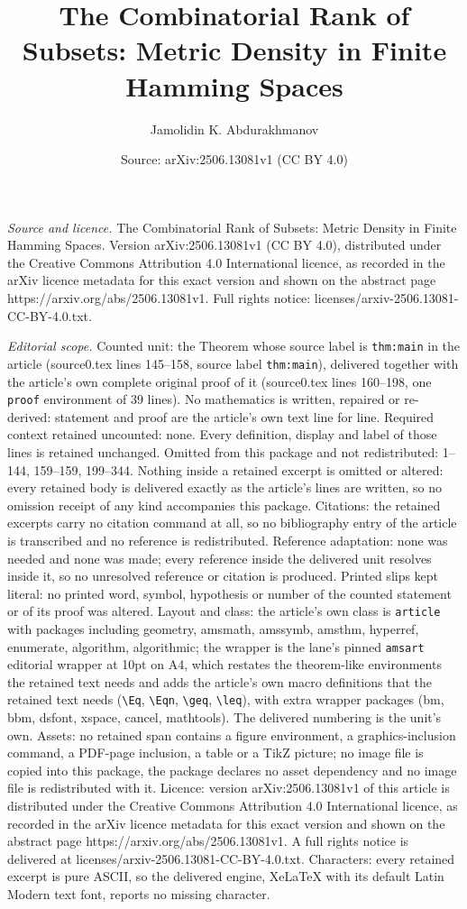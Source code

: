 \documentclass[10pt,a4paper]{amsart}
\title[The Combinatorial Rank of Subsets: Metric Density in Finite ]{The Combinatorial Rank of Subsets: Metric Density in Finite Hamming Spaces}
\author{Jamolidin K. Abdurakhmanov}
\date{Source: arXiv:2506.13081v1 (CC BY 4.0)}
\begin{document}
\maketitle

\noindent\emph{Source and licence.} The Combinatorial Rank of Subsets: Metric Density in Finite Hamming Spaces. Version arXiv:2506.13081v1 (CC BY 4.0), distributed under the Creative Commons Attribution 4.0 International licence, as recorded in the arXiv licence metadata for this exact version and shown on the abstract page https://arxiv.org/abs/2506.13081v1. Full rights notice: licenses/arxiv-2506.13081-CC-BY-4.0.txt.\par\smallskip

\noindent\textit{Editorial scope.} Counted unit: the Theorem whose source label is \texttt{thm:main} in the article (source0.tex lines 145--158, source label \texttt{thm:main}), delivered together with the article's own complete original proof of it (source0.tex lines 160--198, one \texttt{proof} environment of 39 lines). No mathematics is written, repaired or re-derived: statement and proof are the article's own text line for line. Required context retained uncounted: none. Every definition, display and label of those lines is retained unchanged. Omitted from this package and not redistributed: 1--144, 159--159, 199--344. Nothing inside a retained excerpt is omitted or altered: every retained body is delivered exactly as the article's lines are written, so no omission receipt of any kind accompanies this package. Citations: the retained excerpts carry no citation command at all, so no bibliography entry of the article is transcribed and no reference is redistributed. Reference adaptation: none was needed and none was made; every reference inside the delivered unit resolves inside it, so no unresolved reference or citation is produced. Printed slips kept literal: no printed word, symbol, hypothesis or number of the counted statement or of its proof was altered. Layout and class: the article's own class is \texttt{article} with packages including geometry, amsmath, amssymb, amsthm, hyperref, enumerate, algorithm, algorithmic; the wrapper is the lane's pinned \texttt{amsart} editorial wrapper at 10pt on A4, which restates the theorem-like environments the retained text needs and adds the article's own macro definitions that the retained text needs (\texttt{\textbackslash Eq}, \texttt{\textbackslash Eqn}, \texttt{\textbackslash geq}, \texttt{\textbackslash leq}), with extra wrapper packages (bm, bbm, dsfont, xspace, cancel, mathtools). The delivered numbering is the unit's own. Assets: no retained span contains a figure environment, a graphics-inclusion command, a PDF-page inclusion, a table or a TikZ picture; no image file is copied into this package, the package declares no asset dependency and no image file is redistributed with it. Licence: version arXiv:2506.13081v1 of this article is distributed under the Creative Commons Attribution 4.0 International licence, as recorded in the arXiv licence metadata for this exact version and shown on the abstract page https://arxiv.org/abs/2506.13081v1. A full rights notice is delivered at licenses/arxiv-2506.13081-CC-BY-4.0.txt. Characters: every retained excerpt is pure ASCII, so the delivered engine, XeLaTeX with its default Latin Modern text font, reports no missing character.
\end{document}
